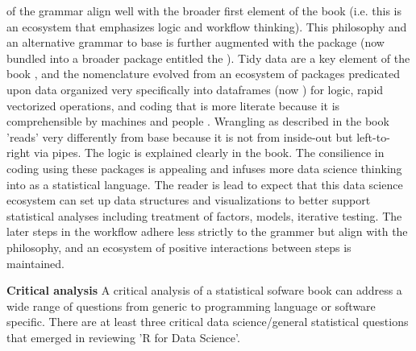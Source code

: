 \documentclass[bookreview]{jss}
\begin{document}
of the grammar align well with the broader first element of the book (i.e. this is an ecosystem that emphasizes logic and workflow thinking). This philosophy and an alternative grammar to base  is further augmented with the package  (now bundled into a broader package entitled the ). Tidy data are a key element of the book \citep{Wickham2014}, and the nomenclature evolved from an ecosystem of packages predicated upon data organized very specifically into dataframes (now ) for logic, rapid vectorized operations, and coding that is more literate because it is comprehensible by machines and people \citep{Knuth1984}. Wrangling as described in the book 'reads' very differently from base  because it is not from inside-out but left-to-right via pipes. The logic is explained clearly in the book. The consilience in coding using these packages is appealing and infuses more data science thinking into  as a statistical language. The reader is lead to expect that this data science ecosystem can set up data structures and visualizations to better support statistical analyses including treatment of factors, models, iterative testing. The later steps in the workflow adhere less strictly to the grammer but align with the philosophy, and 
an ecosystem of positive interactions between steps is maintained. \newline

\textbf{Critical analysis} \newline
A critical analysis of a statistical sofware book can address a wide range of questions from generic to programming language or software specific. There are at least three critical data science/general statistical questions that emerged in reviewing 'R for Data Science'. \newline 
\end{document}
